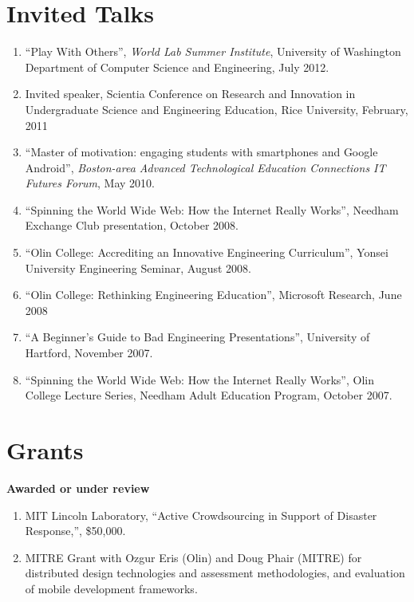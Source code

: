\documentclass[line]{res}
\begin{document}
\begin{resume}
	\section{\sc Invited Talks}
	\begin{enumerate}
		\item ``Play With Others'', \textit{World Lab Summer Institute}, University of Washington Department of Computer Science and Engineering, July 2012.
		\item Invited speaker, Scientia Conference on Research and Innovation in Undergraduate Science and Engineering Education, Rice University, February, 2011
		\item ``Master of motivation: engaging students with smartphones and Google Android'', \textit{Boston-area Advanced Technological Education Connections IT Futures Forum}, May 2010. 
		\item ``Spinning the World Wide Web: How the Internet Really Works'', Needham Exchange Club presentation, October 2008. 
		\item ``Olin College: Accrediting an Innovative Engineering Curriculum'', Yonsei University Engineering Seminar, August 2008. 
		\item ``Olin College: Rethinking Engineering Education'', Microsoft Research, June 2008 
		\item ``A Beginner's Guide to Bad Engineering Presentations'', University of Hartford, November 2007. 
		\item ``Spinning the World Wide Web: How the Internet Really Works'', Olin College Lecture Series, Needham Adult Education Program, October 2007. 
	\end{enumerate}
	
	\section{\sc Grants}
	
	\textbf{Awarded or under review}
	\begin{enumerate}

		\item MIT Lincoln Laboratory, ``Active Crowdsourcing in Support of Disaster Response,'', \$50,000.

		\item MITRE Grant with Ozgur Eris (Olin) and Doug Phair (MITRE) for distributed design technologies and assessment methodologies, and evaluation of mobile development frameworks.
		

\end{enumerate}
\end{resume}
\end{document}

